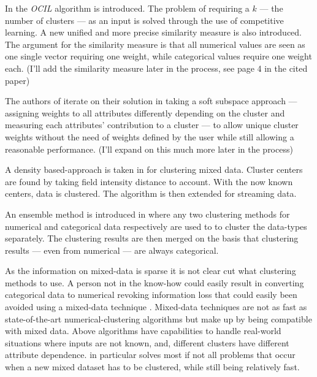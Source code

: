 \documentclass[a4paper,11pt]{article}
\begin{document}

In \cite{CHEUNG20132228} the \textit{OCIL} algorithm is introduced. The problem of requiring a $k$ --- the number of clusters --- as an input is solved through the use of competitive learning. A new unified and more precise similarity measure is also introduced. The argument for the similarity measure is that all numerical values are seen as one single vector requiring one weight, while categorical values require one weight each. (I'll add the similarity measure later in the process, see page 4 in the cited paper)

The authors of \cite{CHEUNG20132228} iterate on their solution in \cite{Jia2018} taking a soft subspace approach --- assigning weights to all attributes differently depending on the cluster and measuring each attributes' contribution to a cluster \cite{DENG201684}  --- to allow unique cluster weights without the need of weights defined by the user while still allowing a reasonable performance. (I'll expand on this much more later in the process)


A density based-approach is taken in \cite{CHEN2016271} for clustering mixed data. Cluster centers are found by taking field intensity distance to account. With the now known centers, data is clustered. The algorithm is then extended for streaming data.

An ensemble method is introduced in \cite{DBLP:journals/corr/abs-cs-0509011} where any two clustering methods for numerical and categorical data respectively are used to to cluster the data-types separately. The clustering results are then merged on the basis that clustering results --- even from numerical --- are always categorical.

As the information on mixed-data is sparse it is not clear cut what clustering methods to use. A person not in the know-how could easily result in converting categorical data to numerical revoking information loss that could easily been avoided using a mixed-data technique \cite{doi:10.1002/9780470316801.ch1}. Mixed-data techniques are not as fast as state-of-the-art numerical-clustering algorithms but make up by being compatible with mixed data. Above algorithms have capabilities to handle real-world situations where inputs are not known, and, different clusters have different attribute dependence. \textcite{Jia2018} in particular solves most if not all problems that occur when a new mixed dataset has to be clustered, while still being relatively fast.
\end{document}

